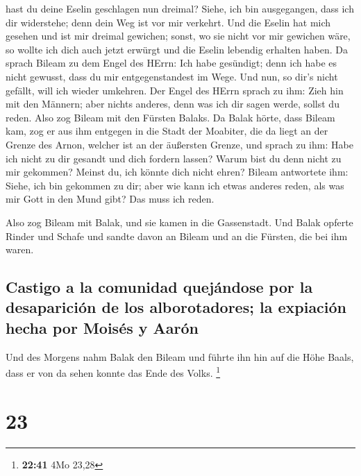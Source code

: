 hast du deine Eselin geschlagen nun dreimal? Siehe, ich bin ausgegangen,
dass ich dir widerstehe; denn dein Weg ist vor mir verkehrt.
 Und die Eselin hat mich gesehen und ist mir dreimal
gewichen; sonst, wo sie nicht vor mir gewichen wäre, so wollte ich dich
auch jetzt erwürgt und die Eselin lebendig erhalten haben.
 Da sprach Bileam zu dem Engel des HErrn: Ich habe
gesündigt; denn ich habe es nicht gewusst, dass du mir entgegenstandest
im Wege. Und nun, so dir's nicht gefällt, will ich wieder umkehren.
 Der Engel des HErrn sprach zu ihm: Zieh hin mit den
Männern; aber nichts anderes, denn was ich dir sagen werde, sollst du
reden. Also zog Bileam mit den Fürsten Balaks.  Da Balak
hörte, dass Bileam kam, zog er aus ihm entgegen in die Stadt der
Moabiter, die da liegt an der Grenze des Arnon, welcher ist an der
äußersten Grenze,  und sprach zu ihm: Habe ich nicht zu
dir gesandt und dich fordern lassen? Warum bist du denn nicht zu mir
gekommen? Meinst du, ich könnte dich nicht ehren?  Bileam
antwortete ihm: Siehe, ich bin gekommen zu dir; aber wie kann ich etwas
anderes reden, als was mir Gott in den Mund gibt? Das muss ich reden.

 Also zog Bileam mit Balak, und sie kamen in die
Gassenstadt.  Und Balak opferte Rinder und Schafe und
sandte davon an Bileam und an die Fürsten, die bei ihm waren.

\hypertarget{castigo-a-la-comunidad-quejuxe1ndose-por-la-desapariciuxf3n-de-los-alborotadores-la-expiaciuxf3n-hecha-por-moisuxe9s-y-aaruxf3n}{%
\subsection{Castigo a la comunidad quejándose por la desaparición de los
alborotadores; la expiación hecha por Moisés y
Aarón}\label{castigo-a-la-comunidad-quejuxe1ndose-por-la-desapariciuxf3n-de-los-alborotadores-la-expiaciuxf3n-hecha-por-moisuxe9s-y-aaruxf3n}}

 Und des Morgens nahm Balak den Bileam und führte ihn hin
auf die Höhe Baals, dass er von da sehen konnte das Ende des Volks.
\footnote{\textbf{22:41} 4Mo 23,28}

\hypertarget{section-22}{%
\section{23}\label{section-22}}

